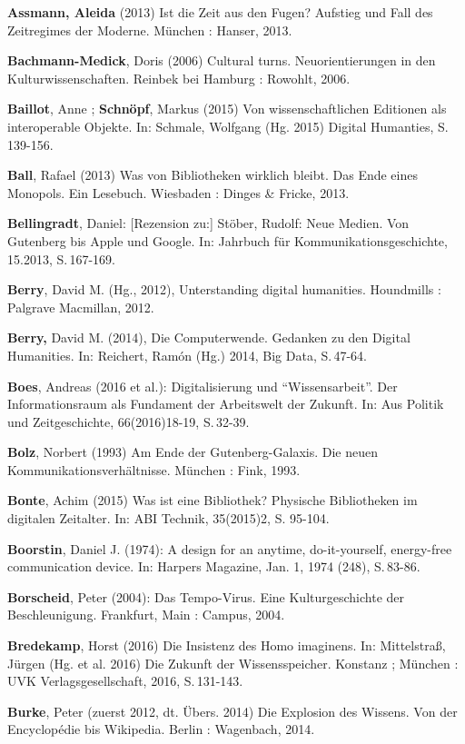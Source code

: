 \documentclass[a4paper,
fontsize=11pt,
oneside,
numbers=noperiodatend,
parskip=half-,
bibliography=totoc,
final
]{scrartcl}
\begin{document}
\textbf{Assmann, Aleida} (2013) Ist die Zeit aus den Fugen? Aufstieg und
Fall des Zeitregimes der Moderne. München : Hanser, 2013.

\textbf{Bachmann-Medick}, Doris (2006) Cultural turns. Neuorientierungen
in den Kulturwissenschaften. Reinbek bei Hamburg : Rowohlt, 2006.

\textbf{Baillot}, Anne ; \textbf{Schnöpf}, Markus (2015) Von
wissenschaftlichen Editionen als interoperable Objekte. In: Schmale,
Wolfgang (Hg. 2015) Digital Humanties, S.\,139-156.

\textbf{Ball}, Rafael (2013) Was von Bibliotheken wirklich bleibt. Das
Ende eines Monopols. Ein Lesebuch. Wiesbaden : Dinges \& Fricke, 2013.

\textbf{Bellingradt}, Daniel: {[}Rezension zu:{]} Stöber, Rudolf: Neue
Medien. Von Gutenberg bis Apple und Google. In: Jahrbuch für
Kommunikationsgeschichte, 15.2013, S.\,167-169.

\textbf{Berry}, David M. (Hg., 2012), Unterstanding digital humanities.
Houndmills : Palgrave Macmillan, 2012.

\textbf{Berry,} David M. (2014), Die Computerwende. Gedanken zu den
Digital Humanities. In: Reichert, Ramón (Hg.) 2014, Big Data, S.\,47-64.

\textbf{Boes}, Andreas (2016 et al.): Digitalisierung und
\enquote{Wissensarbeit}. Der Informationsraum als Fundament der
Arbeitswelt der Zukunft. In: Aus Politik und Zeitgeschichte,
66(2016)18-19, S.\,32-39.

\textbf{Bolz}, Norbert (1993) Am Ende der Gutenberg-Galaxis. Die neuen
Kommunikationsverhältnisse. München : Fink, 1993.

\textbf{Bonte}, Achim (2015) Was ist eine Bibliothek? Physische
Bibliotheken im digitalen Zeitalter. In: ABI Technik, 35(2015)2, S.
95-104.

\textbf{Boorstin}, Daniel J. (1974): A design for an anytime,
do-it-yourself, energy-free communication device. In: Harpers Magazine,
Jan. 1, 1974 (248), S.\,83-86.

\textbf{Borscheid}, Peter (2004): Das Tempo-Virus. Eine Kulturgeschichte
der Beschleunigung. Frankfurt, Main : Campus, 2004.

\textbf{Bredekamp}, Horst (2016) Die Insistenz des Homo imaginens. In:
Mittelstraß, Jürgen (Hg. et al. 2016) Die Zukunft der Wissensspeicher.
Konstanz ; München : UVK Verlagsgesellschaft, 2016, S.\,131-143.

\textbf{Burke}, Peter (zuerst 2012, dt. Übers. 2014) Die Explosion des
Wissens. Von der Encyclopédie bis Wikipedia. Berlin : Wagenbach, 2014.
\end{document}
